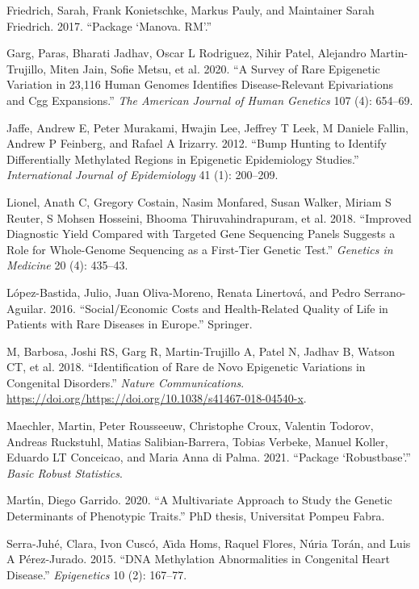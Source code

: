 \documentclass[
]{article}
\begin{document}
\leavevmode\hypertarget{ref-friedrich2017package}{}%
Friedrich, Sarah, Frank Konietschke, Markus Pauly, and Maintainer Sarah
Friedrich. 2017. ``Package `Manova. RM'.''

\leavevmode\hypertarget{ref-garg2020survey}{}%
Garg, Paras, Bharati Jadhav, Oscar L Rodriguez, Nihir Patel, Alejandro
Martin-Trujillo, Miten Jain, Sofie Metsu, et al. 2020. ``A Survey of
Rare Epigenetic Variation in 23,116 Human Genomes Identifies
Disease-Relevant Epivariations and Cgg Expansions.'' \emph{The American
Journal of Human Genetics} 107 (4): 654--69.

\leavevmode\hypertarget{ref-jaffe2012bump}{}%
Jaffe, Andrew E, Peter Murakami, Hwajin Lee, Jeffrey T Leek, M Daniele
Fallin, Andrew P Feinberg, and Rafael A Irizarry. 2012. ``Bump Hunting
to Identify Differentially Methylated Regions in Epigenetic Epidemiology
Studies.'' \emph{International Journal of Epidemiology} 41 (1):
200--209.

\leavevmode\hypertarget{ref-lionel2018improved}{}%
Lionel, Anath C, Gregory Costain, Nasim Monfared, Susan Walker, Miriam S
Reuter, S Mohsen Hosseini, Bhooma Thiruvahindrapuram, et al. 2018.
``Improved Diagnostic Yield Compared with Targeted Gene Sequencing
Panels Suggests a Role for Whole-Genome Sequencing as a First-Tier
Genetic Test.'' \emph{Genetics in Medicine} 20 (4): 435--43.

\leavevmode\hypertarget{ref-lopez2016social}{}%
López-Bastida, Julio, Juan Oliva-Moreno, Renata Linertová, and Pedro
Serrano-Aguilar. 2016. ``Social/Economic Costs and Health-Related
Quality of Life in Patients with Rare Diseases in Europe.'' Springer.

\leavevmode\hypertarget{ref-barbosa2018}{}%
M, Barbosa, Joshi RS, Garg R, Martin-Trujillo A, Patel N, Jadhav B,
Watson CT, et al. 2018. ``Identification of Rare de Novo Epigenetic
Variations in Congenital Disorders.'' \emph{Nature Communications}.
\url{https://doi.org/https://doi.org/10.1038/s41467-018-04540-x}.

\leavevmode\hypertarget{ref-maechler2021package}{}%
Maechler, Martin, Peter Rousseeuw, Christophe Croux, Valentin Todorov,
Andreas Ruckstuhl, Matias Salibian-Barrera, Tobias Verbeke, Manuel
Koller, Eduardo LT Conceicao, and Maria Anna di Palma. 2021. ``Package
`Robustbase'.'' \emph{Basic Robust Statistics}.

\leavevmode\hypertarget{ref-martin2020multivariate}{}%
Martı́n, Diego Garrido. 2020. ``A Multivariate Approach to Study the
Genetic Determinants of Phenotypic Traits.'' PhD thesis, Universitat
Pompeu Fabra.

\leavevmode\hypertarget{ref-serra2015dna}{}%
Serra-Juhé, Clara, Ivon Cuscó, Aı̈da Homs, Raquel Flores, Núria Torán,
and Luis A Pérez-Jurado. 2015. ``DNA Methylation Abnormalities in
Congenital Heart Disease.'' \emph{Epigenetics} 10 (2): 167--77.
\end{document}
